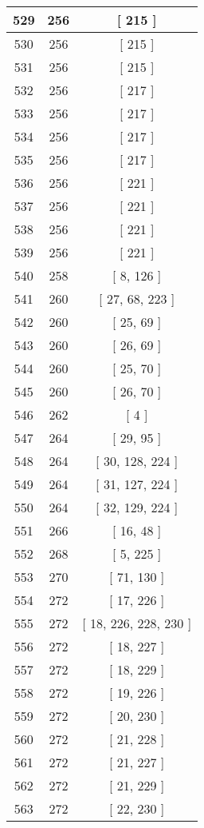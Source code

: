 \begin{center}
\begin{longtable}[H]{|| c c c ||}
\hline
529 & 256 & [ 215 ] \\ 
\hline
530 & 256 & [ 215 ] \\ 
\hline
531 & 256 & [ 215 ] \\ 
\hline
532 & 256 & [ 217 ] \\ 
\hline
533 & 256 & [ 217 ] \\ 
\hline
534 & 256 & [ 217 ] \\ 
\hline
535 & 256 & [ 217 ] \\ 
\hline
536 & 256 & [ 221 ] \\ 
\hline
537 & 256 & [ 221 ] \\ 
\hline
538 & 256 & [ 221 ] \\ 
\hline
539 & 256 & [ 221 ] \\ 
\hline
540 & 258 & [ 8, 126 ] \\ 
\hline
541 & 260 & [ 27, 68, 223 ] \\ 
\hline
542 & 260 & [ 25, 69 ] \\ 
\hline
543 & 260 & [ 26, 69 ] \\ 
\hline
544 & 260 & [ 25, 70 ] \\ 
\hline
545 & 260 & [ 26, 70 ] \\ 
\hline
546 & 262 & [ 4 ] \\ 
\hline
547 & 264 & [ 29, 95 ] \\ 
\hline
548 & 264 & [ 30, 128, 224 ] \\ 
\hline
549 & 264 & [ 31, 127, 224 ] \\ 
\hline
550 & 264 & [ 32, 129, 224 ] \\ 
\hline
551 & 266 & [ 16, 48 ] \\ 
\hline
552 & 268 & [ 5, 225 ] \\ 
\hline
553 & 270 & [ 71, 130 ] \\ 
\hline
554 & 272 & [ 17, 226 ] \\ 
\hline
555 & 272 & [ 18, 226, 228, 230 ] \\ 
\hline
556 & 272 & [ 18, 227 ] \\ 
\hline
557 & 272 & [ 18, 229 ] \\ 
\hline
558 & 272 & [ 19, 226 ] \\ 
\hline
559 & 272 & [ 20, 230 ] \\ 
\hline
560 & 272 & [ 21, 228 ] \\ 
\hline
561 & 272 & [ 21, 227 ] \\ 
\hline
562 & 272 & [ 21, 229 ] \\ 
\hline
563 & 272 & [ 22, 230 ] \\ 
\hline

\end{longtable}
\end{center}
